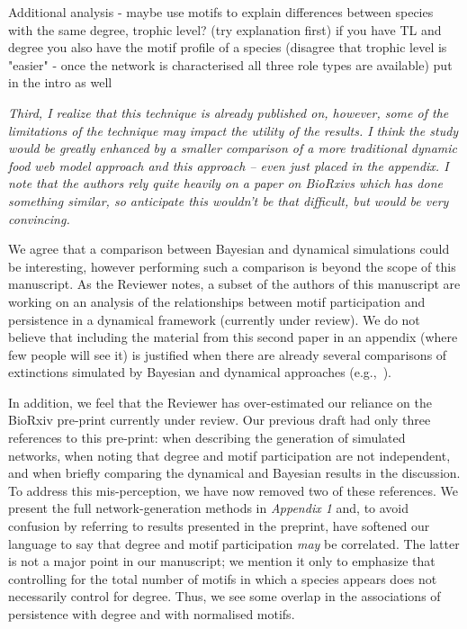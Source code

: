 \documentclass[12pt]{article}
\newcommand{\us}{\rm \setlength{\leftskip}{0.3cm} \setlength{\rightskip}{0.3cm}}
\newcommand{\them}{\it \setlength{\leftskip}{0cm} \setlength{\rightskip}{0cm}}
\begin{document}
\us
Additional analysis - maybe use motifs to explain differences between species with the same degree, trophic level? (try explanation first)
if you have TL and degree you also have the motif profile of a species (disagree that trophic level is "easier" - once the network is characterised all three role types are available) put in the intro as well

\them
Third, I realize that this technique is already published on, however, some of the limitations of the technique may impact the utility of the results. I think the study would be greatly enhanced by a smaller comparison of a more traditional dynamic food web model approach and this approach – even just placed in the appendix. I note that the authors rely quite heavily on a paper on BioRxivs which has done something similar, so anticipate this wouldn’t be that difficult, but would be very convincing.

\us We agree that a comparison between Bayesian and dynamical simulations could be interesting, however performing such a comparison is beyond the scope of this manuscript. As the Reviewer notes, a subset of the authors of this manuscript are working on an analysis of the relationships between motif participation and persistence in a dynamical framework (currently under review). We do not believe that including the material from this second paper in an appendix (where few people will see it) is justified when there are already several comparisons of extinctions simulated by Bayesian and dynamical approaches (e.g.,~\citealp[]{Eklof2013a,others}).


In addition, we feel that the Reviewer has over-estimated our reliance on the BioRxiv pre-print currently under review. Our previous draft had only three references to this pre-print: when describing the generation of simulated networks, when noting that degree and motif participation are not independent, and when briefly comparing the dynamical and Bayesian results in the discussion.
To address this mis-perception, we have now removed two of these references.
We present the full network-generation methods in \emph{Appendix 1} and, to avoid confusion by referring to results presented in the preprint, have softened our language to say that degree and motif participation \emph{may} be correlated. 
The latter is not a major point in our manuscript; we mention it only to emphasize that controlling for the total number of motifs in which a species appears does not necessarily control for degree. 
Thus, we see some overlap in the associations of persistence with degree and with normalised motifs.
\end{document}
